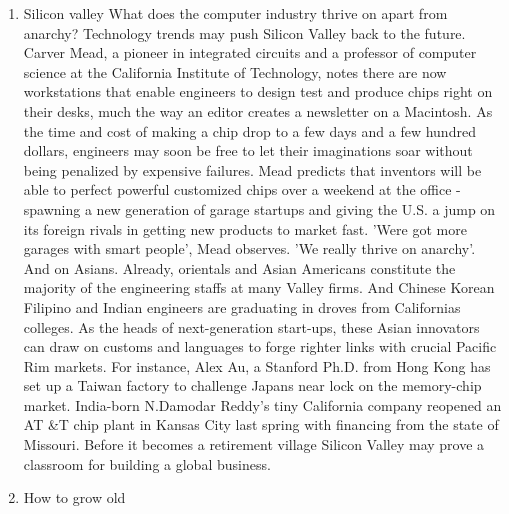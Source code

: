 \begin{enumerate}
\item Silicon valley
What does the computer industry thrive on apart from anarchy? Technology trends may push Silicon Valley back to the future.
Carver Mead, a pioneer in integrated circuits and a professor of computer science at the California Institute of Technology, notes there are now workstations that enable engineers to design test and produce chips right on their desks, much the way an editor creates a newsletter on a Macintosh.
As the time and cost of making a chip drop to a few days and a few hundred dollars, engineers may soon be free to let their imaginations soar without being penalized by expensive failures.
Mead predicts that inventors will be able to perfect powerful customized chips over a weekend at the office - spawning a new generation of garage startups and giving the U.S. a jump on its foreign rivals in getting new products to market fast.
'Were got more garages with smart people', Mead observes.
'We really thrive on anarchy'.
And on Asians.
Already, orientals and Asian Americans constitute the majority of the engineering staffs at many Valley firms.
And Chinese Korean Filipino and Indian engineers are graduating in droves from Californias colleges.
As the heads of next-generation start-ups, these Asian innovators can draw on customs and languages to forge righter links with crucial Pacific Rim markets.
For instance, Alex Au, a Stanford Ph.D. from Hong Kong has set up a Taiwan factory to challenge Japans near lock on the memory-chip market.
India-born N.Damodar Reddy's tiny California company reopened an AT \&T chip plant in Kansas City last spring with financing from the state of Missouri.
Before it becomes a retirement village Silicon Valley may prove a classroom for building a global business.


\item  How to grow old



\end{enumerate}
